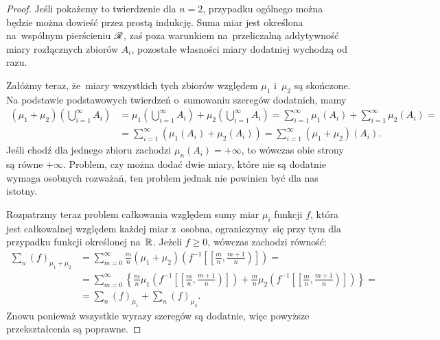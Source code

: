 \documentclass[a4paper,11pt]{article}
\numberwithin{equation}{section}
\begin{document}
\begin{proof}

  Jeśli pokażemy to twierdzenie dla $n = 2$, przypadku ogólnego można
  będzie można dowieść przez prostą indukcję. Suma miar jest określona
  na~wspólnym pierścieniu $\mathcal{R}$, zaś poza warunkiem na~przeliczalną
  addytywność miary rozłącznych zbiorów $A_{ i }$, pozostałe własności
  miary dodatniej wychodzą od razu.

  Załóżmy teraz, że~miary wszystkich tych zbiorów względem $\mu_{ 1 }$
  i~$\mu_{ 2 }$ są skończone. Na podstawie podstawowych twierdzeń
  o~sumowaniu szeregów dodatnich, mamy
  \begin{equation}
    \label{eq:RS-Vol-I-s01-03}
    \begin{split}
      ( \mu_{ 1 } + \mu_{ 2 } )\left( \bigcup_{ i = 1 }^{ \infty } A_{ i } \right)
      &=
        \mu_{ 1 }\left( \bigcup_{ i = 1 }^{ \infty } A_{ i } \right)
        + \mu_{ 2 }\left( \bigcup_{ i = 1 }^{ \infty } A_{ i } \right)
        =
        \sum_{ i = 1 }^{ \infty } \mu_{ 1 }( A_{ i } )
        + \sum_{ i = 1 }^{ \infty } \mu_{ 2 }( A_{ i } ) = \\
      &=
        \sum_{ i = 1 }^{ \infty } \left( \mu_{ 1 }( A_{ i } ) + \mu_{ 2 }( A_{ i } )
        \right)
        = \sum_{ i = 1 }^{ \infty } ( \mu_{ 1 } + \mu_{ 2 } )( A_{ i } ).
    \end{split}
  \end{equation}
  Jeśli chodź dla jednego zbioru zachodzi
  $\mu_{ n }( A_{ i } ) = +\infty$, to wówczas obie strony są równe
  $+\infty$. Problem, czy można dodać dwie miary, które nie są
  dodatnie wymaga osobnych rozważań, ten problem jednak nie powinien
  być dla nas istotny.

  Rozpatrzmy teraz problem całkowania względem sumy miar $\mu_{ i }$
  funkcji $f$, która jest całkowalnej względem każdej miar z~osobna,
  ograniczymy~się przy tym dla przypadku funkcji określonej na~$\mathbb{R}$.
  Jeżeli $f \geq 0$, wówczas zachodzi równość:
  \begin{equation}
    \label{eq:RS-Vol-I-s01-04}
    \begin{split}
      \sum_{ n }( f )_{ \mu_{ 1 } + \mu_{ 2 } }
      &=
        \sum_{ m = 0 }^{ \infty } \frac{ m }{ n } ( \mu_{ 1 } + \mu_{ 2 } )
        \left( f^{ -1 }\left[ \left[ \tfrac{ m }{ n },
        \tfrac{ m + 1 }{ n } \right) \right] \right) = \\
      &=
        \sum_{ m = 0 }^{ \infty } \left\{ \frac{ m }{ n } \mu_{ 1 }\left(
        f^{ -1 }\left[ \left[ \tfrac{ m }{ n }, \tfrac{ m + 1 }{ n }
        \right) \right] \right) \right.
        + \left. \frac{ m }{ n } \mu_{ 2 }\left(
        f^{ -1 }\left[ \left[ \tfrac{ m }{ n }, \tfrac{ m + 1 }{ n }
        \right) \right] \right) \right\} = \\
      &=
        \sum_{ n }( f )_{ \mu_{ 1 } } + \sum_{ n }( f )_{ \mu_{ 2 } }.
    \end{split}
  \end{equation}
  Znowu ponieważ wszystkie wyrazy szeregów są dodatnie, więc powyższe
  przekształcenia są poprawne.


\end{proof}
\end{document}
